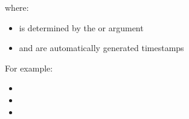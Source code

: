 \documentclass[letterpaper,10pt,english,openany,oneside]{sphinxmanual}
\begin{document}
\sphinxAtStartPar
where:
\begin{itemize}
\item {} 
\sphinxAtStartPar
{} is determined by the  or  argument

\item {} 
\sphinxAtStartPar
{} and  are automatically generated timestamps

\end{itemize}

\sphinxAtStartPar
For example:
\begin{itemize}
\item {} 
\sphinxAtStartPar
{}

\item {} 
\sphinxAtStartPar
{}

\item {} 
\sphinxAtStartPar
{}

\end{itemize}

\sphinxstepscope
\end{document}
